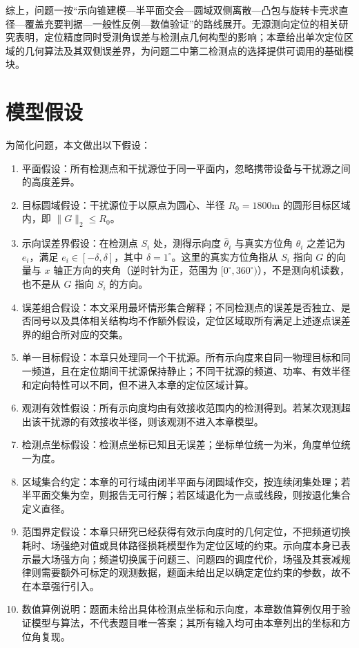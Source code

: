 综上，问题一按“示向锥建模—半平面交会—圆域双侧离散—凸包与旋转卡壳求直径—覆盖充要判据—一般性反例—数值验证”的路线展开。无源测向定位的相关研究表明，定位精度同时受测角误差与检测点几何构型的影响\cite{wang2019,zheng2014,uav2019}；本章给出单次定位区域的几何算法及其双侧误差界，为问题二中第二检测点的选择提供可调用的基础模块。

\section{模型假设}

为简化问题，本文做出以下假设：

\begin{enumerate}
\item 平面假设：所有检测点和干扰源位于同一平面内，忽略携带设备与干扰源之间的高度差异。
\item 目标圆域假设：干扰源位于以原点为圆心、半径 $R_0=1800\mathrm{m}$ 的圆形目标区域内，即 $\lVert G\rVert_2\le R_0$。
\item 示向误差界假设：在检测点 $S_i$ 处，测得示向度 $\hat\theta_i$ 与真实方位角 $\theta_i$ 之差记为 $e_i$，满足 $e_i\in[-\delta,\delta]$，其中 $\delta=1^\circ$。这里的真实方位角指从 $S_i$ 指向 $G$ 的向量与 $x$ 轴正方向的夹角（逆时针为正，范围为 $[0^\circ,360^\circ)$），不是测向机读数，也不是从 $G$ 指向 $S_i$ 的方向。
\item 误差组合假设：本文采用最坏情形集合解释；不同检测点的误差是否独立、是否同号以及具体相关结构均不作额外假设，定位区域取所有满足上述逐点误差界的组合所对应的交集。
\item 单一目标假设：本章只处理同一个干扰源。所有示向度来自同一物理目标和同一频道，且在定位期间干扰源保持静止；不同干扰源的频道、功率、有效半径和定向特性可以不同，但不进入本章的定位区域计算。
\item 观测有效性假设：所有示向度均由有效接收范围内的检测得到。若某次观测超出该干扰源的有效接收半径，则该观测不进入本章模型。
\item 检测点坐标假设：检测点坐标已知且无误差；坐标单位统一为米，角度单位统一为度。
\item 区域集合约定：本章的可行域由闭半平面与闭圆域作交，按连续闭集处理；若半平面交集为空，则报告无可行解；若区域退化为一点或线段，则按退化集合定义直径。
\item 范围界定假设：本章只研究已经获得有效示向度时的几何定位，不把频道切换耗时、场强绝对值或具体路径损耗模型作为定位区域的约束。示向度本身已表示最大场强方向；频道切换属于问题三、问题四的调度代价，场强及其衰减规律则需要额外可标定的观测数据，题面未给出足以确定定位约束的参数，故不在本章强行引入。
\item 数值算例说明：题面未给出具体检测点坐标和示向度，本章数值算例仅用于验证模型与算法，不代表题目唯一答案；其所有输入均可由本章列出的坐标和方位角复现。
\end{enumerate}

